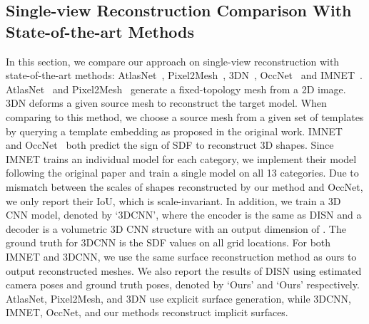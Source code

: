 \subsection{Single-view Reconstruction Comparison With State-of-the-art Methods}
\label{sec:exp:main} 
In this section, we compare our approach on single-view reconstruction with state-of-the-art methods: AtlasNet~\cite{groueix2018}, Pixel2Mesh~\cite{wang2018pixel2mesh}, 3DN~\cite{wang20193dn}, OccNet~\cite{Mescheder2019CVPR} and IMNET~\cite{chen2018learning}. AtlasNet~\cite{groueix2018} and Pixel2Mesh~\cite{wang2018pixel2mesh} generate a fixed-topology mesh from a 2D image. 3DN \cite{wang20193dn} deforms a given source mesh to reconstruct the target model. When comparing to this method, we choose a source mesh from a given set of templates by querying a template embedding as proposed in the original work. IMNET~\cite{chen2018learning} and OccNet~\cite{Mescheder2019CVPR} both predict the sign of SDF to reconstruct 3D shapes. Since IMNET trains an individual model for each category, we implement their model following the original paper and train a single model on all 13 categories. Due to mismatch between the scales of shapes reconstructed by our method and OccNet, we only report their IoU, which is scale-invariant. In addition, we train a 3D CNN model, denoted by `3DCNN', where the encoder is the same as DISN and a decoder is a volumetric 3D CNN structure with an output dimension of . The ground truth for 3DCNN is the SDF values on all  grid locations. For both IMNET and 3DCNN, we use the same surface reconstruction method as ours to output reconstructed meshes. We also report the results of DISN using estimated camera poses and ground truth poses, denoted by `Ours' and `Ours' respectively. AtlasNet, Pixel2Mesh, and 3DN use explicit surface generation, while 3DCNN, IMNET, OccNet, and our methods reconstruct implicit surfaces. 

